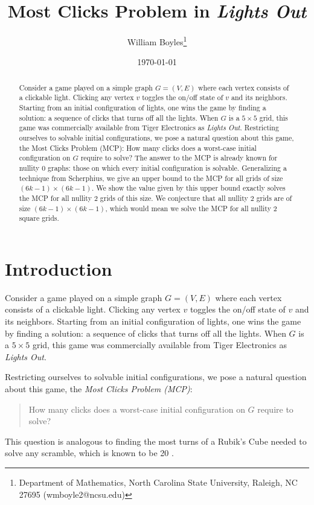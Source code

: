 \documentclass[a4paper]{article}
\begin{document}
	\title{Most Clicks Problem in \textit{Lights Out}}
	\author{William Boyles\thanks{Department of Mathematics, North Carolina State University, Raleigh, NC 27695 (wmboyle2@ncsu.edu)}}
	\date{\today}
	\maketitle
	
	\begin{abstract}
		Consider a game played on a simple graph $G = (V, E)$ where each vertex consists of a clickable light. Clicking any vertex $v$ toggles the on/off state of $v$ and its neighbors. Starting from an initial configuration of lights, one wins the game by finding a solution: a sequence of clicks that turns off all the lights. When $G$ is a $5 \times 5$ grid, this game was commercially available from Tiger Electronics as \textit{Lights Out}. Restricting ourselves to solvable initial configurations, we pose a natural question about this game, the Most Clicks Problem (MCP): How many clicks does a worst-case initial configuration
		on $G$ require to solve? The answer to the MCP is already known for nullity 0 graphs: those on which every initial configuration is solvable. Generalizing a technique from Scherphius, we give an upper bound to the MCP for all grids of size $(6k - 1) \times (6k - 1)$. We show the value given by this upper bound exactly solves the MCP for all nullity 2 grids of this size. We conjecture that all nullity 2 grids are of size $(6k - 1) \times (6k - 1)$, which would mean we solve the MCP for all nullity 2 square grids.
	\end{abstract}
	
	\section{Introduction}
	Consider a game played on a simple graph $G=(V,E)$ where each vertex consists of a clickable light.
	Clicking any vertex $v$ toggles the on/off state of $v$ and its neighbors.
	Starting from an initial configuration of lights, one wins the game by finding a solution: a sequence of clicks that turns off all the lights.
	When $G$ is a $5 \times 5$ grid, this game was commercially available from Tiger Electronics as \textit{Lights Out}.
	
	Restricting ourselves to solvable initial configurations, we pose a natural question about this game, the \textit{Most Clicks Problem (MCP)}:
	\begin{quote}
		How many clicks does a worst-case initial configuration on $G$ require to solve?
	\end{quote}
	This question is analogous to finding the most turns of a Rubik's Cube needed to solve any scramble, which is known to be 20 \cite{Rockiki2013}.
	
\end{document}
